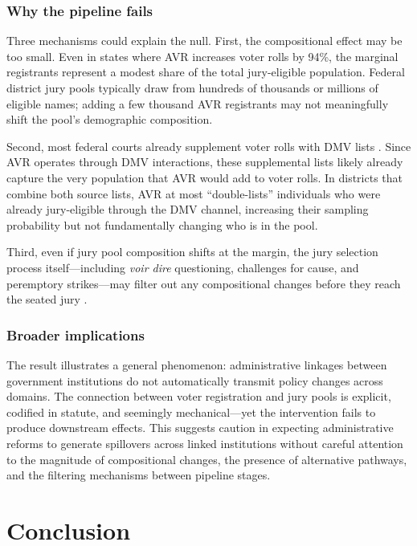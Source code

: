 \documentclass[12pt]{article}
\begin{document}
\subsubsection*{Why the pipeline fails} Three mechanisms could explain the null. First, the compositional effect may be too small. Even in states where AVR increases voter rolls by 94\%, the marginal registrants represent a modest share of the total jury-eligible population. Federal district jury pools typically draw from hundreds of thousands or millions of eligible names; adding a few thousand AVR registrants may not meaningfully shift the pool's demographic composition.

Second, most federal courts already supplement voter rolls with DMV lists \citep{herron2018jury, grosso2015racial}. Since AVR operates through DMV interactions, these supplemental lists likely already capture the very population that AVR would add to voter rolls. In districts that combine both source lists, AVR at most ``double-lists'' individuals who were already jury-eligible through the DMV channel, increasing their sampling probability but not fundamentally changing who is in the pool.

Third, even if jury pool composition shifts at the margin, the jury selection process itself---including \textit{voir dire} questioning, challenges for cause, and peremptory strikes---may filter out any compositional changes before they reach the seated jury \citep{diamond2009jury, hans2007twelve, hannaford2010landscape}.

\subsubsection*{Broader implications} The result illustrates a general phenomenon: administrative linkages between government institutions do not automatically transmit policy changes across domains. The connection between voter registration and jury pools is explicit, codified in statute, and seemingly mechanical---yet the intervention fails to produce downstream effects. This suggests caution in expecting administrative reforms to generate spillovers across linked institutions without careful attention to the magnitude of compositional changes, the presence of alternative pathways, and the filtering mechanisms between pipeline stages.

\section{Conclusion}
\end{document}
